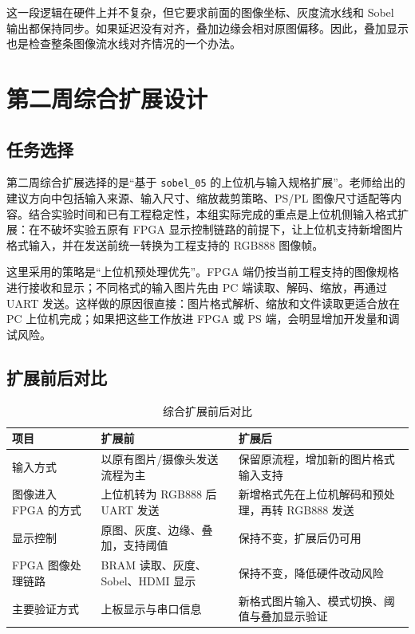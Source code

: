 \documentclass[12pt,a4paper]{ctexart}
\begin{document}
这一段逻辑在硬件上并不复杂，但它要求前面的图像坐标、灰度流水线和 Sobel 输出都保持同步。如果延迟没有对齐，叠加边缘会相对原图偏移。因此，叠加显示也是检查整条图像流水线对齐情况的一个办法。

\section{第二周综合扩展设计}

\subsection{任务选择}

第二周综合扩展选择的是“基于 \verb|sobel_05| 的上位机与输入规格扩展”。老师给出的建议方向中包括输入来源、输入尺寸、缩放裁剪策略、PS/PL 图像尺寸适配等内容。结合实验时间和已有工程稳定性，本组实际完成的重点是上位机侧输入格式扩展：在不破坏实验五原有 FPGA 显示控制链路的前提下，让上位机支持新增图片格式输入，并在发送前统一转换为工程支持的 RGB888 图像帧。

这里采用的策略是“上位机预处理优先”。FPGA 端仍按当前工程支持的图像规格进行接收和显示；不同格式的输入图片先由 PC 端读取、解码、缩放，再通过 UART 发送。这样做的原因很直接：图片格式解析、缩放和文件读取更适合放在 PC 上位机完成；如果把这些工作放进 FPGA 或 PS 端，会明显增加开发量和调试风险。

\subsection{扩展前后对比}

\begin{table}[H]
\centering
\caption{综合扩展前后对比}
\begin{tabular}{p{}p{}p{}}
\toprule
项目 & 扩展前 & 扩展后 \\
\midrule
输入方式 & 以原有图片/摄像头发送流程为主 & 保留原流程，增加新的图片格式输入支持 \\
图像进入 FPGA 的方式 & 上位机转为 RGB888 后 UART 发送 & 新增格式先在上位机解码和预处理，再转 RGB888 发送 \\
显示控制 & 原图、灰度、边缘、叠加，支持阈值 & 保持不变，扩展后仍可用 \\
FPGA 图像处理链路 & BRAM 读取、灰度、Sobel、HDMI 显示 & 保持不变，降低硬件改动风险 \\
主要验证方式 & 上板显示与串口信息 & 新格式图片输入、模式切换、阈值与叠加显示验证 \\
\bottomrule
\end{tabular}
\end{table}
\end{document}
